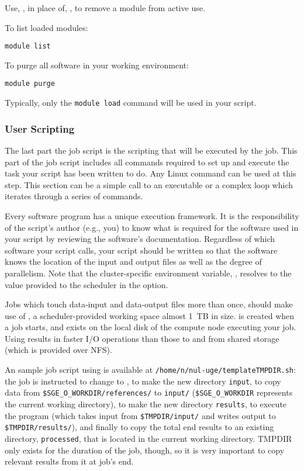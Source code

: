 \documentclass{easychair}
\begin{document}
Use, , in place of, , to remove a module from active use.

To list loaded modules:

\begin{verbatim}
module list
\end{verbatim}

To purge all software in your working environment:

\begin{verbatim}
module purge
\end{verbatim}

Typically, only the \texttt{module load} command will be used in your script.

\subsubsection{User Scripting}

The last part the job script is the scripting that will be executed by the job. 
This part of the job script includes all commands required to set up and 
execute the task your script has been written to do. Any Linux command can be used 
at this step. This section can be a simple call to an executable or a complex 
loop which iterates through a series of commands.

Every software program has a unique execution framework. It is the responsibility 
of the script's author (e.g., you) to know what is required for the software used 
in your script by reviewing the software's documentation. Regardless of which software
your script calls, your script should be written so that the software knows the 
location of the input and output files as well as the degree of parallelism. 
Note that the cluster-specific environment variable, , resolves 
to the value provided to the scheduler in the  option. 

Jobs which touch data-input and data-output files more than once, should make use 
of , a scheduler-provided working space almost 1~TB in size.
 is created when a job starts, and exists on the local disk of the
compute node executing your job. Using  results in faster I/O operations 
than those to and from shared storage (which is provided over NFS). 

An sample job script using  is available at \texttt{/home/n/nul-uge/templateTMPDIR.sh}: 
the job is instructed to change to , to make the new directory \texttt{input}, to copy data from
\texttt{\$SGE\_O\_WORKDIR/references/} to \texttt{input/} (\texttt{\$SGE\_O\_WORKDIR} represents the
current working directory), to make the new directory \texttt{results}, to
execute the program (which takes input from \texttt{\$TMPDIR/input/} and writes
output to \texttt{\$TMPDIR/results/}), and finally to copy the total end results
to an existing directory, \texttt{processed}, that is located in the current
working directory. TMPDIR only exists for the duration of the job, though,
so it is very important to copy relevant results from it at job's end.
\end{document}
